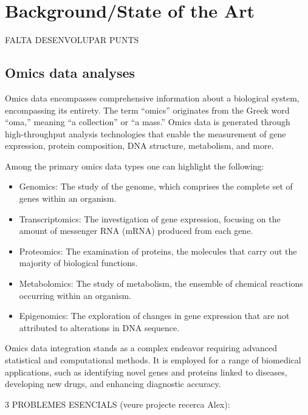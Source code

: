 \documentclass[a4paper, nobind]{templates/ociamthesis}
\providecommand{\tightlist}{%
  \setlength{\itemsep}{0pt}\setlength{\parskip}{0pt}}
\begin{document}
\hypertarget{backgroundstate-of-the-art}{%
\section{Background/State of the Art}\label{backgroundstate-of-the-art}}

FALTA DESENVOLUPAR PUNTS

\hypertarget{omics-data-analyses}{%
\subsection{Omics data analyses}\label{omics-data-analyses}}

Omics data encompasses comprehensive information about a biological system, encompassing its entirety. The term ``omics'' originates from the Greek word ``oma,'' meaning ``a collection'' or ``a mass.'' Omics data is generated through high-throughput analysis technologies that enable the measurement of gene expression, protein composition, DNA structure, metabolism, and more.

Among the primary omics data types one can highlight the following:

\begin{itemize}
\tightlist
\item
  Genomics: The study of the genome, which comprises the complete set of genes within an organism.
\item
  Transcriptomics: The investigation of gene expression, focusing on the amount of messenger RNA (mRNA) produced from each gene.
\item
  Proteomics: The examination of proteins, the molecules that carry out the majority of biological functions.
\item
  Metabolomics: The study of metabolism, the ensemble of chemical reactions occurring within an organism.
\item
  Epigenomics: The exploration of changes in gene expression that are not attributed to alterations in DNA sequence.
\end{itemize}

Omics data integration stands as a complex endeavor requiring advanced statistical and computational methods. It is employed for a range of biomedical applications, such as identifying novel genes and proteins linked to diseases, developing new drugs, and enhancing diagnostic accuracy.

3 PROBLEMES ESENCIALS (veure projecte recerca Alex):
\end{document}

